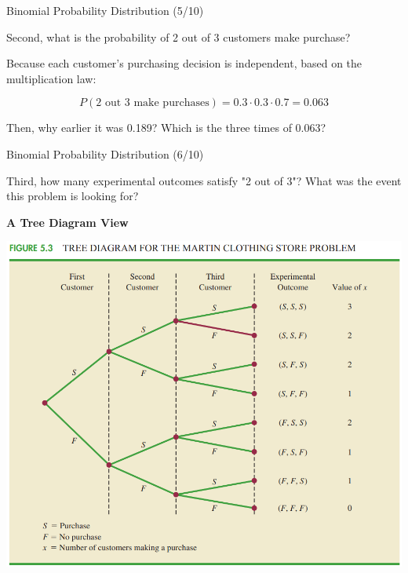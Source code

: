 \documentclass{beamer}
\begin{document}
\begin{frame}{Binomial Probability Distribution (5/10)}

Second, what is the probability of 2 out of 3 customers make purchase? 

\vspace{0.3 cm}
Because each customer's purchasing decision is independent, based on the multiplication law: 

$$ P(\text{2 out 3 make purchases}) = 0.3 \cdot 0.3 \cdot 0.7 = 0.063 $$

\vspace{0.3 cm}
Then, why earlier it was 0.189? Which is the three times of 0.063?

\end{frame}




\begin{frame}{Binomial Probability Distribution (6/10)}

Third, how many experimental outcomes satisfy "2 out of 3"? What was the event this problem is looking for? 

\begin{center}

\textbf{A Tree Diagram View}

\vspace{0.3 cm}

\includegraphics[scale=0.30]{images/ch3TreeDiagram.png}

\end{center}


\end{frame}
\end{document}
